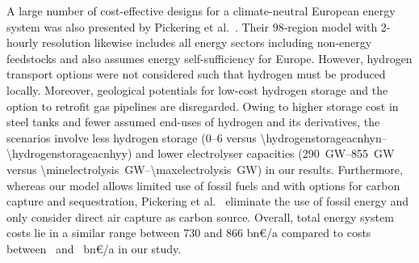 A large number of cost-effective designs for a climate-neutral European energy
system was also presented by Pickering et
al.~\cite{pickeringDiversityOptions2022}. Their 98-region model with 2-hourly
resolution likewise includes all energy sectors including non-energy feedstocks
and also assumes energy self-sufficiency for Europe. However, hydrogen transport
options were not considered such that hydrogen must be produced locally.
Moreover, geological potentials for low-cost hydrogen storage and the option to
retrofit gas pipelines are disregarded. Owing to higher storage cost in steel
tanks and fewer assumed end-uses of hydrogen and its derivatives, the scenarios
involve less hydrogen storage (\SIrange{0}{6}{\twh} versus
\SIrange{\hydrogenstorageacnhyn}{\hydrogenstorageacnhyy}{\twh}) and lower
electrolyser capacities (\SIrange{290}{855}{\giga\watt} versus
\SIrange{\minelectrolysis}{\maxelectrolysis}{\giga\watt}) in our results.
Furthermore, whereas our model allows limited use of fossil fuels and with
options for carbon capture and sequestration, Pickering et
al.~\cite{pickeringDiversityOptions2022} eliminate the
use of fossil energy and only consider direct air capture as carbon
source. Overall, total energy system costs lie in a similar range between 730
and 866 bn\euro/a compared to costs between \minsystemcost~and
\maxsystemcost~bn\euro/a in our study.





